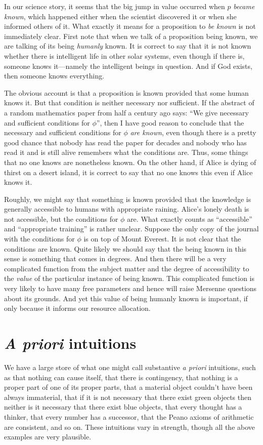 In our science story, it seems that the big jump in value occurred when $p$ \textit{became known}, which happened 
either when the scientist discovered it or when she informed others of it. 
What exactly it means for a proposition to \textit{be known} is not immediately clear. 
First note that when we talk of a proposition being known, we are talking of its being \textit{humanly} known. 
It is correct to say that it is not known whether
there is intelligent life in other solar systems, even though if there is, someone knows it---namely the intelligent
beings in question. And if God exists, then someone knows everything.

The obvious account is that a proposition is known provided that some human knows it. But that condition is neither necessary nor sufficient. If the abstract of a random mathematics paper from half a century ago says: ``We give necessary and sufficient conditions for $\phi$'', then I have good reason to conclude that the necessary and sufficient conditions for $\phi$ \textit{are known}, even
though there is a pretty good chance that nobody has read the paper for decades and nobody who has read it and
is still alive remembers what the conditions are. Thus, some things that no one knows are nonetheless known. 
On the other hand, if Alice is dying of thirst on a desert island, it is correct to say that no one knows this
even if Alice knows it.

Roughly, we might say that something is known provided that the knowledge is generally accessible to humans 
with appropriate raining. Alice's lonely death is not accessible, but the conditions for $\phi$ are. What exactly counts as ``accessible'' and ``appropriate training'' is rather unclear. Suppose the only copy of the journal with the 
conditions for $\phi$ is on top of Mount Everest. It is not clear that the conditions are known. Quite likely
we should say that the being known in this sense is something that comes in degrees. And then there will be a 
very complicated function from the subject matter and the degree of accessibility to the \textit{value} of the particular
instance of being known. This complicated function is very likely to have many free parameters and hence will
raise Mersenne questions about its grounds. And yet this value of being humanly known is important, if only because it informs our resource allocation.

\section{\textit{A priori} intuitions}
We have a large store of what one might call substantive \textit{a priori} intuitions, such as that nothing can cause itself,
that there is contingency, that nothing is a proper part of one of its proper parts, that a material object couldn't
have been always immaterial, that if it is not necessary that there exist green objects then neither is it necessary 
that there exist blue objects, that every thought has a thinker, that every number has a successor, that the Peano axioms 
of arithmetic are consistent, and so on. These intuitions vary in strength, though all the above examples are very plausible.

